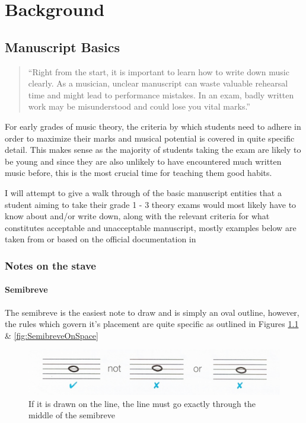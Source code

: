 \chapter{Background}

\section{Manuscript Basics}

\blockquote{``Right from the start, it is important to learn how to write down music clearly. As a musician, unclear manuscript can waste valuable rehearsal time and might lead to performance mistakes. In an exam, badly written work may be misunderstood and could lose you vital marks.'' \cite{taylor1989ab}}


For early grades of music theory, the criteria by which students need to adhere in order to maximize their marks and musical potential is covered in quite specific detail. This makes sense as the majority of students taking the exam are likely to be young and since they are also unlikely to have encountered much written music before, this is the most crucial time for teaching them good habits.

I will attempt to give a walk through of the basic manuscript entities that a student aiming to take their grade 1 - 3 theory exams would most likely have to know about and/or write down, along with the relevant criteria for what constitutes acceptable and unacceptable manuscript, mostly examples below are taken from or based on the official documentation in \cite{taylor2008music}


\subsection*{Notes on the stave}

\subsubsection*{Semibreve}

The semibreve is the easiest note to draw and is simply an oval outline, however, the rules which govern it's placement are quite specific as outlined in Figures \ref{fig:SemibreveOnLine} \& \ref{fig:SemibreveOnSpace}

\begin{figure}[h!]
  \includegraphics[width=\linewidth]{gfx/basic/semibreve-on-line.png}
  \centering
  \caption{If it is drawn on the line, the line must go exactly through the middle of the semibreve}
  \label{fig:SemibreveOnLine}
\end{figure}

